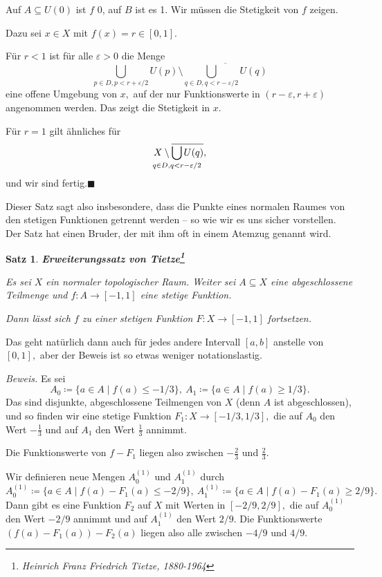 \documentclass[12pt]{scrbook}   %
\newtheorem{satzX}[alles]{Satz}
\newenvironment{satz}[1]{\begin{satzX}{\bf #1}\nopagebreak\par}{\end{satzX}}
\newcommand{\qed}{\phantom{.}\hfill{$\blacksquare$}}
\newcommand{\da}{\coloneqq}
\begin{document}
Auf $A \subseteq U(0)$ ist $f$ 0, auf $B$ ist es 1. Wir m\"ussen die 
Stetigkeit von $f$ zeigen.

Dazu sei $x\in X$ mit $f(x)=r\in [0,1].$ 

F\"ur $r<1$ ist f\"ur alle 
$\varepsilon >0$ die Menge 
$$\bigcup_{p\in D,p< r+\varepsilon/2} U(p) \setminus
  \overline{\bigcup_{{q\in D,q< r-\varepsilon/2}} {U(q)}}$$
eine offene Umgebung von $x,$ auf der nur Funktionswerte in 
$(r-\varepsilon, r+\varepsilon)$ angenommen werden. Das zeigt die Stetigkeit 
in $x.$

F\"ur $r=1$ gilt \"ahnliches f\"ur
$$X\setminus\overline{\bigcup_{\mathclap{q\in D,q< r-\varepsilon/2}} {U(q)}},$$
und wir sind fertig.\qed


Dieser Satz sagt also insbesondere, dass die Punkte eines normalen Raumes von 
den stetigen Funktionen getrennt werden -- so wie wir es uns sicher vorstellen.
Der Satz hat einen Bruder, der mit ihm oft in einem Atemzug genannt wird.

\begin{satz}{Erweiterungssatz von Tietze\footnote{Heinrich Franz Friedrich 
Tietze, 1880-1964}}
Es sei $X$ ein normaler topologischer Raum. Weiter sei $A\subseteq X$ eine 
abgeschlossene Teilmenge und $f:A\longrightarrow [-1,1]$ eine stetige Funktion.

Dann l\"asst sich $f$ zu einer stetigen Funktion $F:X\longrightarrow [-1,1]$ fortsetzen.
\end{satz}

Das geht nat\"urlich dann auch f\"ur jedes andere Intervall $[a,b]$ anstelle 
von $[0,1],$ aber der Beweis ist so etwas weniger notationslastig.

{\it Beweis.} Es sei 
$$A_0\da\{a\in A\mid f(a)\leq -1/3\},\ A_1\da \{a\in A\mid f(a)\geq 1/3\}.$$ 
Das sind disjunkte, abgeschlossene 
Teilmengen von $X$ (denn $A$ ist abgeschlossen), und so finden wir eine stetige
Funktion $F_1:X\longrightarrow [-1/3,1/3],$ 
die auf $A_0$ den Wert $-\frac13$ und auf $A_1$ den Wert $\frac13$ annimmt.

Die Funktionswerte von $f-F_1$ liegen also zwischen $-\frac23$ und $\frac23$.

Wir definieren neue Mengen $A_0^{(1)}$ und $A_1^{(1)}$ durch 
$$A_0^{(1)}\da\{a\in A\mid f(a)-F_1(a)\leq -2/9\},\ 
A_1^{(1)}\da \{a\in A\mid f(a)-F_1(a)\geq 2/9\}.$$ 
Dann gibt es eine Funktion $F_2$ auf $X$ mit Werten in $[-2/9,2/9],$ die auf 
$A_0^{(1)}$ den Wert $-2/9$ annimmt und auf $A_1^{(1)}$ den Wert $2/9.$
Die Funktionswerte $(f(a)-F_1(a))-F_2(a)$ liegen also alle zwischen $-4/9$ und
$4/9.$
\end{document}
